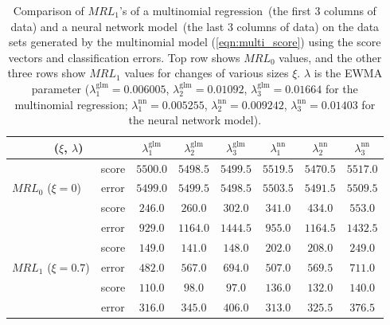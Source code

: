 \documentclass[twoside,11pt]{article}
\begin{document}
\begin{appendices}
\begin{table}[H]
\centering
\begin{tabular}{lc|ccc|ccc}
\toprule
\multicolumn{2}{c|}{($ \xi$, $ \lambda$)} & {$  \lambda_1^{\text{glm}}$} & {$ \lambda_2^{\text{glm}}$} & {$ \lambda_3^{\text{glm}}$} & {$  \lambda_1^{\text{nn}}$} & {$ \lambda_2^{\text{nn}}$} & {$ \lambda_3^{\text{nn}}$}\\
\toprule
\multirow{3}{*}{$MRL_0$ ($\xi=0$)} & score &$5500.0$ & $5498.5$ & $5499.5$ &$5519.5$ & $5470.5$ & $5517.0$ \\
& error &$5499.0$ & $5499.5$ & $5498.5$ &$5503.5$ & $5491.5$ & $5509.5$ \\
\midrule
\midrule
\multirow{3}{*}{$MRL_1$ ($\xi=0.5$)} & score &$\bm{246.0}$ & $\bm{260.0}$ & $\bm{302.0}$ &$ \bm{341.0}$ & $\bm{434.0}$ & $\bm{553.0}$ \\
& error &$929.0$ & $1164.0$ & $1444.5$ &$955.0$ & $1164.5$ & $1432.5$ \\
\midrule
\multirow{3}{*}{$MRL_1$ ($\xi=0.7$)} & score &$\bm{149.0}$ & $\bm{141.0}$ & $\bm{148.0}$ &$\bm{202.0}$ & $\bm{208.0}$ & $\bm{249.0}$ \\
& error &$482.0$ & $567.0$ & $694.0$ &$507.0$ & $569.5$ & $711.0$\\
\midrule
\multirow{3}{*}{$MRL_1$ ($\xi=0.9$)} & score &$\bm{110.0}$ & $\bm{98.0}$ & $\bm{97.0}$ &$\bm{136.0}$ & $\bm{132.0}$ & $\bm{140.0}$ \\
& error &$316.0$ & $345.0$ & $406.0$ &$313.0$ & $325.5$ & $376.5$\\
\midrule
\end{tabular}
\caption{Comparison of $MRL_1$'s of a multinomial regression~(the first $3$ columns of data) and a neural network model~(the last $3$ columns of data) on the data sets generated by the multinomial model (\ref{eqn:multi_score}) using the score vectors and classification errors. Top row shows $MRL_0$ values, and the other three rows show $MRL_1$ values for changes of various sizes $\xi$. $\lambda$ is the EWMA parameter ({$ \lambda_1^{\text{glm}} = 0.006005$}, {$ \lambda_2^{\text{glm}} = 0.01092$}, {$ \lambda_3^{\text{glm}} = 0.01664$} for the multinomial regression; {$ \lambda_1^{\text{nn}} =0.005255$}, {$ \lambda_2^{\text{nn}}=0.009242$}, {$ \lambda_3^{\text{nn}}=0.01403$} for the neural network model).}
\label{tab:multi_logi_MRL}
\end{table}



\end{appendices}
\end{document}
